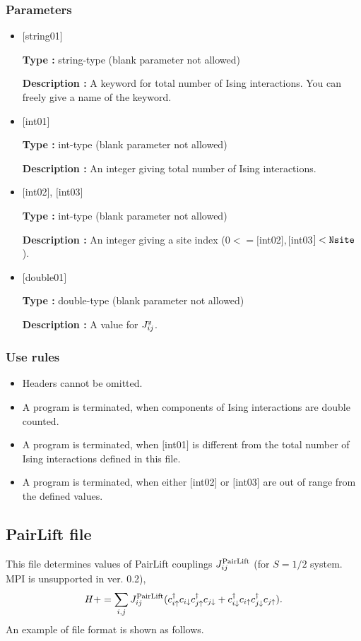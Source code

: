 \subsubsection{Parameters}
 \begin{itemize}

   \item  $[$string01$]$
   
    {\bf Type :} string-type (blank parameter not allowed)

   {\bf Description :}  A keyword for total number of Ising interactions. You can freely give a name of the keyword.

   \item  $[$int01$]$
   
    {\bf Type :} int-type (blank parameter not allowed)

   {\bf Description :} An integer giving total number of Ising interactions.

  \item  $[$int02$]$, $[$int03$]$
  
 {\bf Type :} int-type (blank parameter not allowed)

{\bf Description :} An integer giving a site index ($0<= [$int02$], [$int03$]<\verb|Nsite|$).
 
 \item  $[$double01$]$
   
   {\bf Type :} double-type (blank parameter not allowed)

  {\bf Description :}   A value for $J_{ij}^{\rm z}$.
  
\end{itemize}

\subsubsection{Use rules}
\begin{itemize}
\item Headers cannot be omitted. 
\item A program is terminated, when components of Ising interactions are double counted.
\item A program is terminated, when $[$int01$]$ is different from the total number of Ising interactions defined in this file.
\item A program is terminated, when either $[$int02$]$ or $[$int03$]$ are out of range from the defined values.
\end{itemize}


\newpage
\subsection{PairLift file}
\label{Subsec:pairlift}
This file determines values of PairLift couplings $J_{ij}^{\rm PairLift}$ {(for $S=1/2$ system. MPI is unsupported in ver. 0.2)},
\begin{equation}
H+=\sum_{i,j}J_{ij}^{\rm PairLift} (c_ {i \uparrow}^{\dag}c_{i\downarrow}c_{j \uparrow}^{\dag}c_{j \downarrow}+c_ {i \downarrow}^{\dag}c_{i\uparrow}c_{j \downarrow}^{\dag}c_{j \uparrow}).
\end{equation}
An example of file format is shown as follows.

